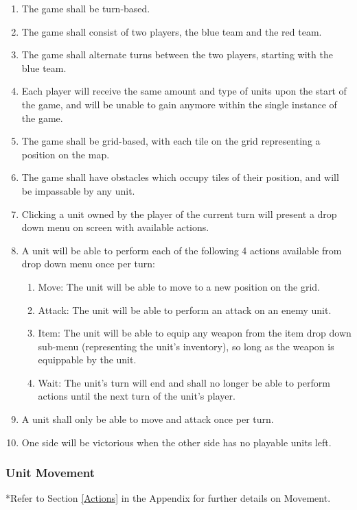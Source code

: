 \documentclass{article}
\begin{document}
\begin{enumerate}[resume]
    \item The game shall be turn-based.
    \item The game shall consist of two players, the blue team and the red team.
    \item The game shall alternate turns between the two players, starting with the blue team.
    \item Each player will receive the same amount and type of units upon the start of the game, and will be unable to gain anymore within the single instance of the game.
    \item The game shall be grid-based, with each tile on the grid representing a position on the map.
    \item The game shall have obstacles which occupy tiles of their position, and will be impassable by any unit.
    \item Clicking a unit owned by the player of the current turn will present a drop down menu on screen with available actions.
    \item A unit will be able to perform each of the following 4 actions available from drop down menu once per turn:
    \begin{enumerate}
        \item Move: The unit will be able to move to a new position on the grid.
        \item Attack: The unit will be able to perform an attack on an enemy unit.
        \item Item: The unit will be able to equip any weapon from the item drop down sub-menu (representing the unit's inventory), so long as the weapon is equippable by the unit.
        \item Wait: The unit's turn will end and shall no longer be able to perform actions until the next turn of the unit's player.
    \end{enumerate}
    \item A unit shall only be able to move and attack once per turn.
    \item One side will be victorious when the other side has no playable units left.
\end{enumerate}

\subsubsection{Unit Movement} \label{Movement}
*Refer to Section \ref{Actions} in the Appendix for further details on Movement.
\end{document}
